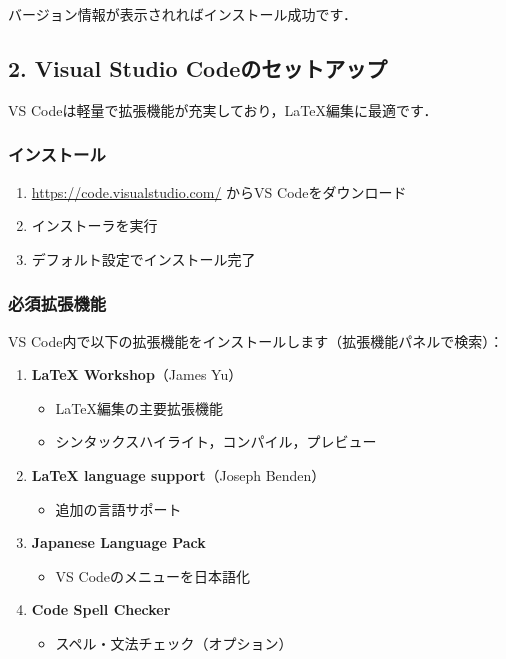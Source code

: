 \documentclass[11pt]{ltjarticle}
\begin{document}
バージョン情報が表示されればインストール成功です．

\subsection{2. Visual Studio Codeのセットアップ}

VS Codeは軽量で拡張機能が充実しており，LaTeX編集に最適です．

\subsubsection{インストール}

\begin{enumerate}
  \item \url{https://code.visualstudio.com/} からVS Codeをダウンロード
  \item インストーラを実行
  \item デフォルト設定でインストール完了
\end{enumerate}

\subsubsection{必須拡張機能}

VS Code内で以下の拡張機能をインストールします（拡張機能パネルで検索）：

\begin{enumerate}
  \item \textbf{LaTeX Workshop}（James Yu）
    \begin{itemize}
      \item LaTeX編集の主要拡張機能
      \item シンタックスハイライト，コンパイル，プレビュー
    \end{itemize}
  \item \textbf{LaTeX language support}（Joseph Benden）
    \begin{itemize}
      \item 追加の言語サポート
    \end{itemize}
  \item \textbf{Japanese Language Pack}
    \begin{itemize}
      \item VS Codeのメニューを日本語化
    \end{itemize}
  \item \textbf{Code Spell Checker}
    \begin{itemize}
      \item スペル・文法チェック（オプション）
    \end{itemize}
\end{enumerate}
\end{document}
